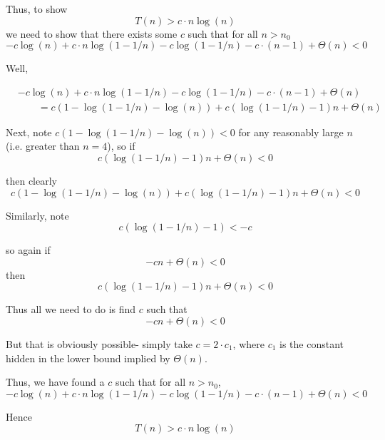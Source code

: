 \documentclass[paper=a4, fontsize=11pt]{scrartcl} %
\numberwithin{equation}{section} %
\numberwithin{figure}{section} %
\numberwithin{table}{section} %
\begin{document}
Thus, to show
\[T(n) > c \cdot n \log (n)\]
we need to show that there exists some $c$ such that for all $n > n_0$
\[- c \log (n) + c\cdot n \log(1 -1/n) - c  \log(1 -1/n) - c\cdot(n - 1) + \Theta(n) < 0\]

Well,

\begin{align*}
&- c \log (n) + c\cdot n \log(1 -1/n) - c  \log(1 -1/n) - c\cdot(n - 1) + \Theta(n)\\
&\qquad{}= c (1 - \log(1 -1/n)  - \log (n)) + c\left(\log(1 -1/n) - 1\right) n + \Theta(n)
\end{align*}

Next, note $ c (1 - \log(1 -1/n)  - \log (n)) < 0 $ for any reasonably large $n$ (i.e. greater than $n = 4$), so if
\[ c\left(\log(1 -1/n) - 1\right) n + \Theta(n)< 0\]

then clearly
\[c (1 - \log(1 -1/n)  - \log (n)) + c\left(\log(1 -1/n) - 1\right) n + \Theta(n) < 0 \]

Similarly, note
\[c\left(\log(1 -1/n) - 1\right) < -c\]

so again if
\[ -c n + \Theta(n)< 0\]
then
\[ c\left(\log(1 -1/n) - 1\right) n + \Theta(n)< 0\]

Thus all we need to do is find $c$ such that 
\[ -c n + \Theta(n)< 0\]

But that is obviously possible- simply take $c = 2\cdot c_1$, where $c_1$ is the constant hidden in the lower bound implied by $\Theta(n)$.

Thus, we have found a $c$ such that for all $n > n_0$,
\[- c \log (n) + c\cdot n \log(1 -1/n) - c  \log(1 -1/n) - c\cdot(n - 1) + \Theta(n) < 0\]

Hence 
\[T(n) > c \cdot n \log (n)\]


\end{document}
